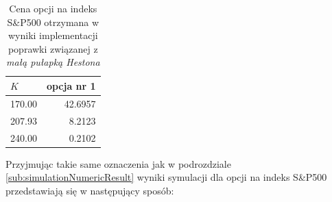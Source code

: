 \documentclass{pracamgr}
\begin{document}
\begin{table}[ht!]
\centering 
\begin{tabular}{@{\hskip 0.5in}l |  @{\hskip 0.5in}r }
\toprule
$K$ & opcja nr 1 \\
\midrule
170.00 & 42.6957 \\
207.93 & 8.2123 \\
240.00 & 0.2102 \\
\bottomrule
\end{tabular}
\caption{Cena opcji na indeks S\&P500 otrzymana w wyniki implementacji 
         poprawki związanej z \textit{małą pułapką Hestona}}
\label{tab:littleTrapOption2}
\end{table}
Przyjmując takie same oznaczenia jak w podrozdziale 
\ref{sub:simulationNumericResult} wyniki symulacji dla opcji na indeks 
S\&P500 przedstawiają się w następujący sposób:
\end{document}
